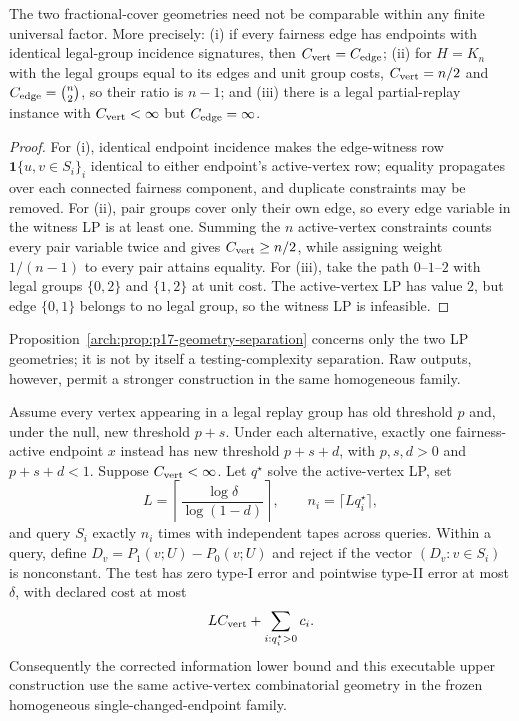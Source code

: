 \begin{proposition}
\label{arch:prop:p17-geometry-separation}
The two fractional-cover geometries need not be comparable within any finite
universal factor.  More precisely: (i) if every fairness edge has endpoints
with identical legal-group incidence signatures, then
$C_{\rm vert}=C_{\rm edge}$; (ii) for $H=K_n$ with the legal groups equal to
its edges and unit group costs,
$C_{\rm vert}=n/2$ and $C_{\rm edge}=\binom n2$, so their ratio is $n-1$;
and (iii) there is a legal partial-replay instance with
$C_{\rm vert}<\infty$ but $C_{\rm edge}=\infty$.
\end{proposition}

\begin{proof}
For (i), identical endpoint incidence makes the edge-witness row
$\mathbf 1\{u,v\in S_i\}_i$ identical to either endpoint's active-vertex
row; equality propagates over each connected fairness component, and duplicate
constraints may be removed.  For (ii), pair groups cover only their own edge, so
every edge variable in the witness LP is at least one.  Summing the $n$
active-vertex constraints counts every pair variable twice and gives
$C_{\rm vert}\ge n/2$, while assigning weight $1/(n-1)$ to every pair
attains equality.  For (iii), take the path $0$--$1$--$2$ with legal groups
$\{0,2\}$ and $\{1,2\}$ at unit cost.  The active-vertex LP has value $2$,
but edge $\{0,1\}$ belongs to no legal group, so the witness LP is infeasible.
\end{proof}

Proposition~\ref{arch:prop:p17-geometry-separation} concerns only the two LP
geometries; it is not by itself a testing-complexity separation.  Raw outputs,
however, permit a stronger construction in the same homogeneous family.

\begin{proposition}
\label{arch:prop:p17-active-contrast}
Assume every vertex appearing in a legal replay group has old threshold $p$
and, under the null, new threshold $p+s$.  Under each alternative, exactly one
fairness-active endpoint $x$ instead has new threshold $p+s+d$, with
$p,s,d>0$ and $p+s+d<1$.  Suppose $C_{\rm vert}<\infty$.  Let $q^\star$
solve the active-vertex LP, set
\begin{equation}\label{eq:appendix-07-open-problems-009}
L=\left\lceil\frac{\log\delta}{\log(1-d)}\right\rceil,
\qquad
n_i=\lceil Lq_i^\star\rceil,
\end{equation}
and query $S_i$ exactly $n_i$ times with independent tapes across queries.
Within a query, define $D_v=P_1(v;U)-P_0(v;U)$ and reject if the vector
$(D_v:v\in S_i)$ is nonconstant.  The test has zero type-I error and
pointwise type-II error at most $\delta$, with declared cost at most
\begin{equation}\label{eq:appendix-07-open-problems-010}
L C_{\rm vert}+\sum_{i:q_i^\star>0}c_i.
\end{equation}
Consequently the corrected information lower bound and this executable upper
construction use the same active-vertex combinatorial geometry in the frozen
homogeneous single-changed-endpoint family.
\end{proposition}

